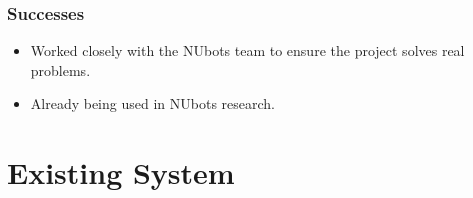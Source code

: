 \documentclass{beamer}
\begin{document}
\begin{frame}
	\frametitle{Successes}
	\begin{itemize}
		\item Worked closely with the NUbots team to ensure the project solves real problems.
		\item Already being used in NUbots research.
	\end{itemize}
\end{frame}

\section{Existing System}
\begin{frame}
	\sectionpage
\end{frame}
\end{document}
